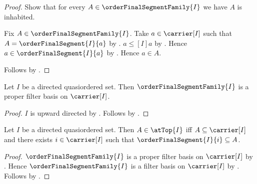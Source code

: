 \begin{proof}
    Show that for every $A\in\orderFinalSegmentFamily{I}$ we have
        $A$ is inhabited.
    \begin{subproof}
        Fix $A\in\orderFinalSegmentFamily{I}$.
        Take $a\in\carrier[I]$ such that
            $A=\orderFinalSegment{I}{a}$ by
            .
        $a\mathrel{\leq[I]}a$ by
            .
        Hence $a\in\orderFinalSegment{I}{a}$ by
            .
        Hence $a\in A$.
    \end{subproof}
    Follows by .
\end{proof}

\begin{corollary}\label{directed_final_segments_are_proper_filter_basis}
    Let $I$ be a directed quasiordered set.
    Then $\orderFinalSegmentFamily{I}$ is a proper filter basis on
        $\carrier[I]$.
\end{corollary}
\begin{proof}
    $I$ is upward directed by
        .
    Follows by
        .
\end{proof}

\begin{theorem}\label{at_top_iff_contains_final_segment}
    Let $I$ be a directed quasiordered set.
    Then $A\in\atTop{I}$ iff $A\subseteq\carrier[I]$ and there exists
        $i\in\carrier[I]$ such that
        $\orderFinalSegment{I}{i}\subseteq A$.
\end{theorem}
\begin{proof}
    $\orderFinalSegmentFamily{I}$ is a proper filter basis on
        $\carrier[I]$ by
        .
    Hence $\orderFinalSegmentFamily{I}$ is a filter basis on
        $\carrier[I]$ by
        .
    Follows by
        .
\end{proof}

